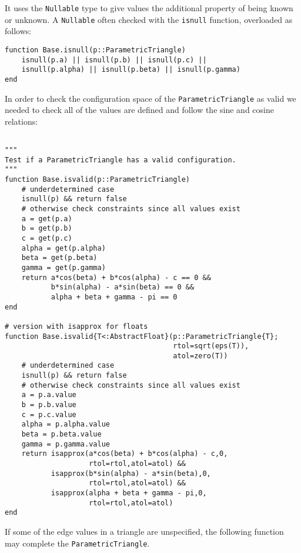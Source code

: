 It uses the \texttt{Nullable} type to give values the additional
property of being known or unknown. A \texttt{Nullable} often checked with the
\texttt{isnull} function, overloaded as follows:

\begin{lstlisting}
function Base.isnull(p::ParametricTriangle)
    isnull(p.a) || isnull(p.b) || isnull(p.c) ||
    isnull(p.alpha) || isnull(p.beta) || isnull(p.gamma)
end
\end{lstlisting}

In order to check the configuration space of the \texttt{ParametricTriangle} as
valid we needed to check all of the values are defined and
follow the sine and cosine relations:

\begin{lstlisting}

"""
Test if a ParametricTriangle has a valid configuration.
"""
function Base.isvalid(p::ParametricTriangle)
    # underdetermined case
    isnull(p) && return false
    # otherwise check constraints since all values exist
    a = get(p.a)
    b = get(p.b)
    c = get(p.c)
    alpha = get(p.alpha)
    beta = get(p.beta)
    gamma = get(p.gamma)
    return a*cos(beta) + b*cos(alpha) - c == 0 &&
           b*sin(alpha) - a*sin(beta) == 0 &&
           alpha + beta + gamma - pi == 0
end

# version with isapprox for floats
function Base.isvalid{T<:AbstractFloat}(p::ParametricTriangle{T};
                                        rtol=sqrt(eps(T)),
                                        atol=zero(T))
    # underdetermined case
    isnull(p) && return false
    # otherwise check constraints since all values exist
    a = p.a.value
    b = p.b.value
    c = p.c.value
    alpha = p.alpha.value
    beta = p.beta.value
    gamma = p.gamma.value
    return isapprox(a*cos(beta) + b*cos(alpha) - c,0,
                    rtol=rtol,atol=atol) &&
           isapprox(b*sin(alpha) - a*sin(beta),0,
                    rtol=rtol,atol=atol) &&
           isapprox(alpha + beta + gamma - pi,0,
                    rtol=rtol,atol=atol)
end
\end{lstlisting}

If some of the edge values in a triangle are unspecified, the following
function may complete the \texttt{ParametricTriangle}.

